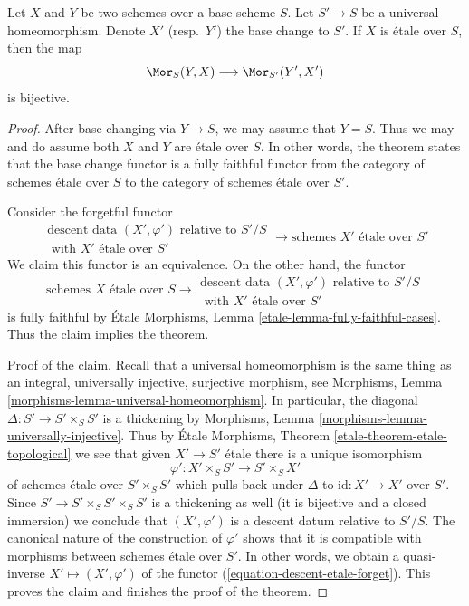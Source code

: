 \begin{theorem}
\label{theorem-etale-topological}
Let $X$ and $Y$ be two schemes over a base scheme $S$. Let
$S' \to S$ be a universal homeomorphism.
Denote $X'$ (resp.\ $Y'$) the base change to $S'$.
If $X$ is \'etale over $S$, then the map
$$
\Mor_S(Y, X) \longrightarrow \Mor_{S'}(Y', X')
$$
is bijective.
\end{theorem}

\begin{proof}
After base changing via $Y \to S$, we may assume that $Y = S$.
Thus we may and do assume both $X$ and $Y$ are \'etale over $S$.
In other words, the theorem states that the base change functor
is a fully faithful functor from the category of schemes \'etale
over $S$ to the category of schemes \'etale over $S'$.

\medskip\noindent
Consider the forgetful functor
\begin{equation}
\label{equation-descent-etale-forget}
\begin{matrix}
\text{descent data }(X', \varphi')\text{ relative to }S'/S \\
\text{ with }X'\text{ \'etale over }S'
\end{matrix}
\longrightarrow
\text{schemes }X'\text{ \'etale over }S'
\end{equation}
We claim this functor is an equivalence. On the other hand, the
functor
\begin{equation}
\label{equation-descent-etale}
\text{schemes }X\text{ \'etale over }S \longrightarrow
\begin{matrix}
\text{descent data }(X', \varphi')\text{ relative to }S'/S \\
\text{ with }X'\text{ \'etale over }S'
\end{matrix}
\end{equation}
is fully faithful by \'Etale Morphisms, Lemma
\ref{etale-lemma-fully-faithful-cases}.
Thus the claim implies the theorem.

\medskip\noindent
Proof of the claim.
Recall that a universal homeomorphism is the same thing as an
integral, universally injective, surjective morphism, see
Morphisms, Lemma \ref{morphisms-lemma-universal-homeomorphism}.
In particular, the diagonal $\Delta : S' \to S' \times_S S'$ is a thickening
by Morphisms, Lemma \ref{morphisms-lemma-universally-injective}.
Thus by \'Etale Morphisms, Theorem
\ref{etale-theorem-etale-topological}
we see that given $X' \to S'$ \'etale there is a unique isomorphism
$$
\varphi' : X' \times_S S' \to S' \times_S X'
$$
of schemes \'etale over $S' \times_S S'$ which pulls back under
$\Delta$ to $\text{id} : X' \to X'$ over $S'$.
Since $S' \to S' \times_S S' \times_S S'$
is a thickening as well (it is bijective and a closed immersion)
we conclude that $(X', \varphi')$ is a descent datum relative to $S'/S$.
The canonical nature of the construction of $\varphi'$ shows
that it is compatible with morphisms between schemes \'etale over $S'$.
In other words, we obtain a quasi-inverse
$X' \mapsto (X', \varphi')$ of the functor
(\ref{equation-descent-etale-forget}). This proves the claim and
finishes the proof of the theorem.
\end{proof}